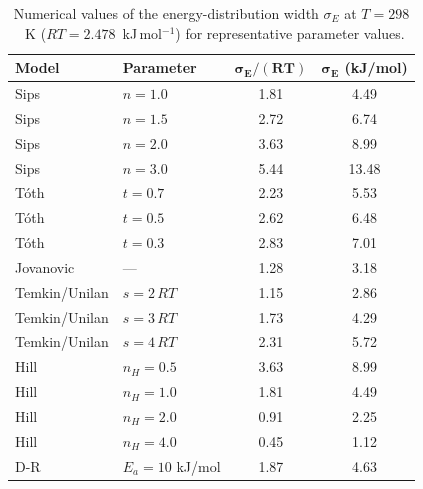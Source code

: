 
\begin{table}[htbp]
\centering
\small
\caption{Numerical values of the energy-distribution width $\sigma_E$
  at $T = 298$~K ($RT = 2.478$~kJ\,mol$^{-1}$) for representative
  parameter values.}
\label{tab:sigma_numerical}
\renewcommand{\arraystretch}{1.3}
\begin{tabular}{llcc}
\hline
\textbf{Model} & \textbf{Parameter} & $\boldsymbol{\sigma_E/(RT)}$ & $\boldsymbol{\sigma_E}$ (kJ/mol) \\
\hline
Sips & $n = 1.0$ & 1.81 & 4.49 \\
Sips & $n = 1.5$ & 2.72 & 6.74 \\
Sips & $n = 2.0$ & 3.63 & 8.99 \\
Sips & $n = 3.0$ & 5.44 & 13.48 \\
T\'oth & $t = 0.7$ & 2.23 & 5.53 \\
T\'oth & $t = 0.5$ & 2.62 & 6.48 \\
T\'oth & $t = 0.3$ & 2.83 & 7.01 \\
Jovanovic & --- & 1.28 & 3.18 \\
Temkin/Unilan & $s = 2\,RT$ & 1.15 & 2.86 \\
Temkin/Unilan & $s = 3\,RT$ & 1.73 & 4.29 \\
Temkin/Unilan & $s = 4\,RT$ & 2.31 & 5.72 \\
Hill & $n_H = 0.5$ & 3.63 & 8.99 \\
Hill & $n_H = 1.0$ & 1.81 & 4.49 \\
Hill & $n_H = 2.0$ & 0.91 & 2.25 \\
Hill & $n_H = 4.0$ & 0.45 & 1.12 \\
D-R & $E_a = 10$ kJ/mol & 1.87 & 4.63 \\
\hline
\end{tabular}
\end{table}
